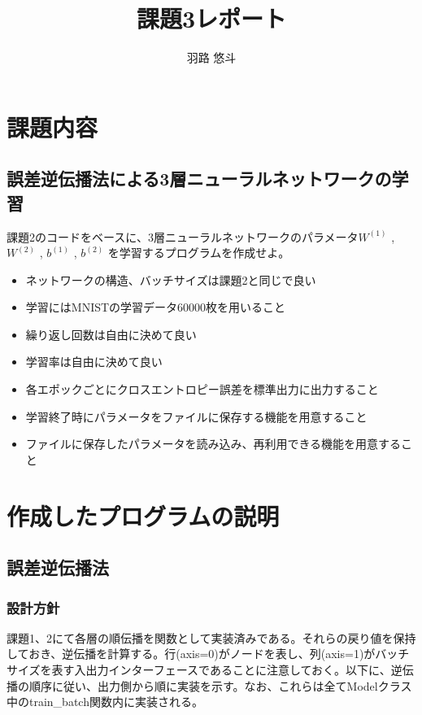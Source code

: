 \documentclass[platex,dvipdfmx]{jsarticle}
\begin{document}
  \title{課題3レポート}
  \author{羽路 悠斗}
  \maketitle

  \section{課題内容}

  \subsection{誤差逆伝播法による3層ニューラルネットワークの学習}

  課題2のコードをベースに、3層ニューラルネットワークのパラメータ$W^{(1)}$ , $W^{(2)}$ , $b^{(1)}$ , $b^{(2)}$ を学習するプログラムを作成せよ。

  \begin{itemize}
    \item ネットワークの構造、バッチサイズは課題2と同じで良い
    \item 学習にはMNISTの学習データ60000枚を用いること
    \item 繰り返し回数は自由に決めて良い
    \item 学習率は自由に決めて良い
    \item 各エポックごとにクロスエントロピー誤差を標準出力に出力すること
    \item 学習終了時にパラメータをファイルに保存する機能を用意すること
    \item ファイルに保存したパラメータを読み込み、再利用できる機能を用意すること
  \end{itemize}

  \newpage

  \section{作成したプログラムの説明}
  
  \subsection{誤差逆伝播法}

  \subsubsection{設計方針}

  課題1、2にて各層の順伝播を関数として実装済みである。それらの戻り値を保持しておき、逆伝播を計算する。行(axis=0)がノードを表し、列(axis=1)がバッチサイズを表す入出力インターフェースであることに注意しておく。以下に、逆伝播の順序に従い、出力側から順に実装を示す。なお、これらは全てModelクラス中のtrain\_batch関数内に実装される。
\end{document}

